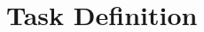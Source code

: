 \section{Task Definition} \label{apx:assignment}
\enlargethispage{2.5cm}
\begin{adjustwidth}{-0.23cm}{0cm} \hfuzz=7.0pt \vfuzz=20.0pt
\end{adjustwidth}
\newpage

